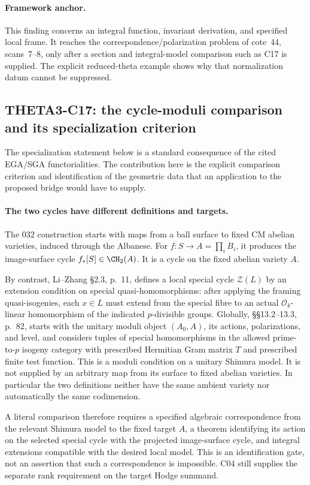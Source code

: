 \documentclass[11pt]{article}
\theoremstyle{definition}\newtheorem{definition}[theorem]{Definition}\newtheorem{remark}[theorem]{Remark}
\begin{document}
\paragraph{Framework anchor.}
This finding concerns an integral function, invariant derivation, and
specified local frame.  It reaches the correspondence/polarization
problem of cote~44, scans~7--8, only after a section and integral-model
comparison such as C17 is supplied.  The explicit reduced-theta example
shows why that normalization datum cannot be suppressed.

\subsection{THETA3-C17: the cycle-moduli comparison and its specialization criterion}
\label{C17}

The specialization statement below is a standard consequence of the cited
EGA/SGA functorialities.  The contribution here is the explicit comparison
criterion and identification of the geometric data that an application
to the proposed bridge would have to supply.

\paragraph{The two cycles have different definitions and targets.}
The 032 construction starts with maps from a ball surface to fixed
CM abelian varieties, induced through the Albanese. For
$f:S\to A=\prod_iB_i$, it produces the image-surface cycle
$f_*[S]\in\CH_2(A)$. It is a cycle on the fixed abelian variety
$A$.

By contrast, Li--Zhang \S2.3, p.~11, defines a local special cycle
$\mathcal Z(L)$ by an extension condition on special
quasi-homomorphisms: after applying the framing quasi-isogenies,
each $x\in L$ must extend from the special fibre to an actual
$\mathcal O_k$-linear homomorphism of the indicated
$p$-divisible groups. Globally, \S\S13.2--13.3, p.~82, starts
with the unitary moduli object $(A_0,A)$, its actions,
polarizations, and level, and considers tuples of special
homomorphisms in the allowed prime-to-$p$ isogeny category with
prescribed Hermitian Gram matrix $T$ and prescribed finite test
function. This is a moduli condition on a unitary Shimura model.
It is not supplied by an arbitrary map from its surface to fixed
abelian varieties. In particular the two definitions neither have
the same ambient variety nor automatically the same codimension.

A literal comparison therefore requires a specified algebraic
correspondence from the relevant Shimura model to the fixed target
$A$, a theorem identifying its action on the selected special cycle
with the projected image-surface cycle, and integral extensions
compatible with the desired local model. This is an identification
gate, not an assertion that such a correspondence is impossible.
C04 still supplies the separate rank requirement on the target
Hodge summand.
\end{document}
